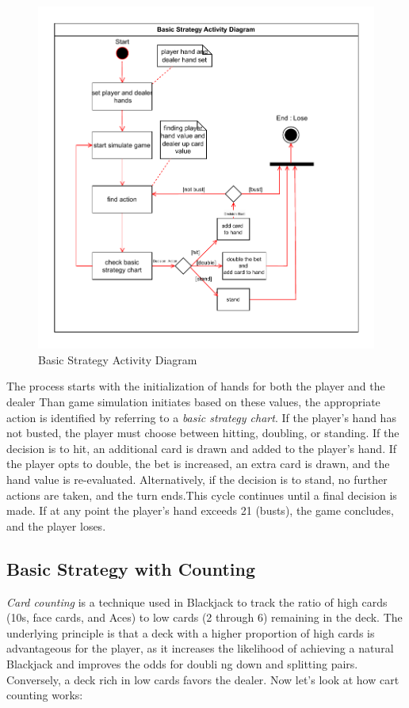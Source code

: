 \documentclass[a4paper,12pt]{report}
\begin{document}
\begin{figure}[htb]
\begin{center}
\includegraphics[scale=1,keepaspectratio]{figures/basic_strategy_activity_diagram.pdf}
\caption{Basic Strategy Activity Diagram} 
\label{fig:BasicStrategy_activitydiagram}
\end{center}
\end{figure}

The process starts with the initialization of hands for both the player and the dealer Than game simulation initiates based on these values, the appropriate action is identified by referring to a \textit{basic strategy chart}. If the player's hand has not busted, the player must choose between hitting, doubling, or standing. If the decision is to hit, an additional card is drawn and added to the player's hand. If the player opts to double, the bet is increased, an extra card is drawn, and the hand value is re-evaluated. Alternatively, if the decision is to stand, no further actions are taken, and the turn ends.This cycle continues until a final decision is made. If at any point the player's hand exceeds 21 (busts), the game concludes, and the player loses.

\subsection{Basic Strategy with Counting}
\label{basic_strateg_with_counting}
\textit{Card counting} is a technique used in Blackjack to track the ratio of high cards (10s, face cards, and Aces) to low cards (2 through 6) remaining in the deck. The underlying principle is that a deck with a higher proportion of high cards is advantageous for the player, as it increases the likelihood of achieving a natural Blackjack and improves the odds for doubli  ng down and splitting pairs. Conversely, a deck rich in low cards favors the dealer. Now let's look at how cart counting works:
\end{document}

